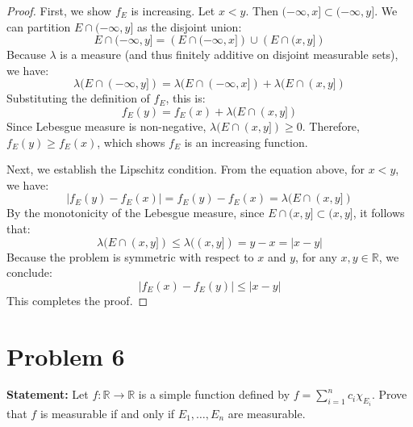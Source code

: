 \documentclass[12pt]{article}
\begin{document}
\begin{proof}
First, we show $f_E$ is increasing. Let $x < y$. Then $(-\infty, x] \subset (-\infty, y]$. We can partition $E \cap (-\infty, y]$ as the disjoint union:
\[
E \cap (-\infty, y] = \left( E \cap (-\infty, x] \right) \cup \left( E \cap (x, y] \right)
\]
Because $\lambda$ is a measure (and thus finitely additive on disjoint measurable sets), we have:
\[
\lambda(E \cap (-\infty, y]) = \lambda(E \cap (-\infty, x]) + \lambda(E \cap (x, y])
\]
Substituting the definition of $f_E$, this is:
\[
f_E(y) = f_E(x) + \lambda(E \cap (x, y])
\]
Since Lebesgue measure is non-negative, $\lambda(E \cap (x, y]) \ge 0$. Therefore, $f_E(y) \ge f_E(x)$, which shows $f_E$ is an increasing function.

Next, we establish the Lipschitz condition. From the equation above, for $x < y$, we have:
\[
|f_E(y) - f_E(x)| = f_E(y) - f_E(x) = \lambda(E \cap (x, y])
\]
By the monotonicity of the Lebesgue measure, since $E \cap (x, y] \subset (x, y]$, it follows that:
\[
\lambda(E \cap (x, y]) \le \lambda((x, y]) = y - x = |x - y|
\]
Because the problem is symmetric with respect to $x$ and $y$, for any $x, y \in \mathbb{R}$, we conclude:
\[
|f_E(x) - f_E(y)| \le |x - y|
\]
This completes the proof.
\end{proof}

\section*{Problem 6}
\textbf{Statement:} Let $f:\mathbb{R}\rightarrow\mathbb{R}$ is a simple function defined by $f=\sum_{i=1}^{n}c_{i}\chi_{E_{i}}$. Prove that $f$ is measurable if and only if $E_{1},\dots,E_{n}$ are measurable.
\end{document}
